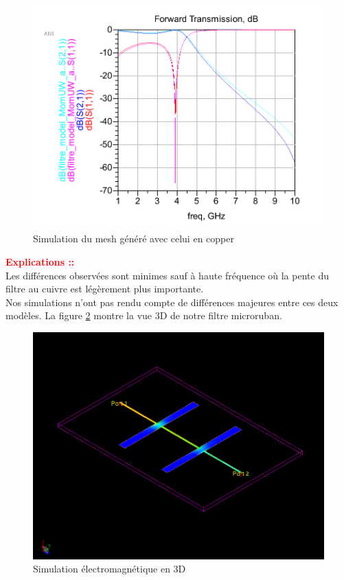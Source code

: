 \documentclass[a4paper]{article}
\begin{document}
\begin{figure}[!htb]
\begin{center}
  \includegraphics[scale=0.35]{mesh_copper.png}
  \caption{Simulation du mesh g\'en\'er\'e avec celui en copper}
  \label{sim_momentum_copper}
\end{center}
\end{figure}

\textbf{\textcolor{red}{Explications ::}}\\
Les diff\'erences observ\'ees sont minimes sauf \`a haute fr\'equence o\`u la pente du filtre au cuivre est l\'eg\`erement plus importante.\\
Nos simulations n'ont pas rendu compte de diff\'erences majeures entre ces deux mod\`eles. La figure \ref{sim_3D} montre la vue 3D de
notre filtre microruban.

\begin{figure}[!htb]
\begin{center}
  \includegraphics[scale=0.30]{3D_electromag_sim.png}
  \caption{Simulation \'electromagn\'etique en 3D}
  \label{sim_3D}
\end{center}
\end{figure}
\end{document}
